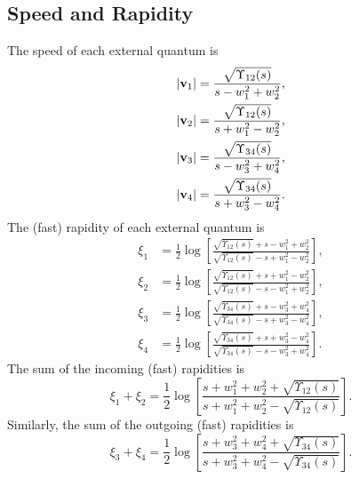 \subsection{Speed and Rapidity}
The speed of each external quantum is
\begin{align}
	\left\lvert \mathbf{v}_{1} \right\rvert &= \frac{\sqrt{\Upsilon_{12}(s)}}{s - w_{1}^{2} + w_{2}^{2}}, \\
	\left\lvert \mathbf{v}_{2} \right\rvert &= \frac{\sqrt{\Upsilon_{12}(s)}}{s + w_{1}^{2} - w_{2}^{2}}, \\
	\left\lvert \mathbf{v}_{3} \right\rvert &= \frac{\sqrt{\Upsilon_{34}(s)}}{s - w_{3}^{2} + w_{4}^{2}}, \\
	\left\lvert \mathbf{v}_{4} \right\rvert &= \frac{\sqrt{\Upsilon_{34}(s)}}{s + w_{3}^{2} - w_{4}^{2}}.
\end{align}
The (fast) rapidity of each external quantum is
\begin{align}
	\xi_{1} &= \frac{1}{2} \log{\left[ \frac{\sqrt{\Upsilon_{12}(s)} + s - w_{1}^{2} + w_{2}^{2}}{\sqrt{\Upsilon_{12}(s)} - s + w_{1}^{2} - w_{2}^{2}} \right]}, \\
	\xi_{2} &= \frac{1}{2} \log{\left[ \frac{\sqrt{\Upsilon_{12}(s)} + s + w_{1}^{2} - w_{2}^{2}}{\sqrt{\Upsilon_{12}(s)} - s - w_{1}^{2} + w_{2}^{2}} \right]}, \\
	\xi_{3} &= \frac{1}{2} \log{\left[ \frac{\sqrt{\Upsilon_{34}(s)} + s - w_{3}^{2} + w_{4}^{2}}{\sqrt{\Upsilon_{34}(s)} - s + w_{3}^{2} - w_{4}^{2}} \right]}, \\
	\xi_{4} &= \frac{1}{2} \log{\left[ \frac{\sqrt{\Upsilon_{34}(s)} + s + w_{3}^{2} - w_{4}^{2}}{\sqrt{\Upsilon_{34}(s)} - s - w_{3}^{2} + w_{4}^{2}} \right]}.
\end{align}
The sum of the incoming (fast) rapidities is
\begin{equation}
	\xi_{1} + \xi_{2} = \frac{1}{2} \log{\left[ \frac{s + w_{1}^{2} + w_{2}^{2} + \sqrt{\Upsilon_{12}(s)}}{s + w_{1}^{2} + w_{2}^{2} - \sqrt{\Upsilon_{12}(s)}} \right]}.
\end{equation}
Similarly, the sum of the outgoing (fast) rapidities is
\begin{equation}
	\xi_{3} + \xi_{4} = \frac{1}{2} \log{\left[ \frac{s + w_{3}^{2} + w_{4}^{2} + \sqrt{\Upsilon_{34}(s)}}{s + w_{3}^{2} + w_{4}^{2} - \sqrt{\Upsilon_{34}(s)}} \right]}.
\end{equation}
